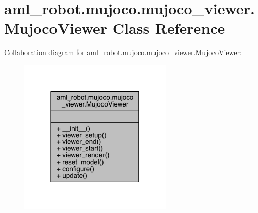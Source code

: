 \hypertarget{classaml__robot_1_1mujoco_1_1mujoco__viewer_1_1_mujoco_viewer}{}\section{aml\+\_\+robot.\+mujoco.\+mujoco\+\_\+viewer.\+Mujoco\+Viewer Class Reference}
\label{classaml__robot_1_1mujoco_1_1mujoco__viewer_1_1_mujoco_viewer}


Collaboration diagram for aml\+\_\+robot.\+mujoco.\+mujoco\+\_\+viewer.\+Mujoco\+Viewer\+:\nopagebreak
\begin{figure}[H]
\begin{center}
\leavevmode
\includegraphics[width=210pt]{classaml__robot_1_1mujoco_1_1mujoco__viewer_1_1_mujoco_viewer__coll__graph}
\end{center}
\end{figure}
